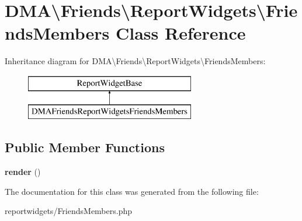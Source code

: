 \hypertarget{classDMA_1_1Friends_1_1ReportWidgets_1_1FriendsMembers}{}\section{D\+M\+A\textbackslash{}Friends\textbackslash{}Report\+Widgets\textbackslash{}Friends\+Members Class Reference}
\label{classDMA_1_1Friends_1_1ReportWidgets_1_1FriendsMembers}
Inheritance diagram for D\+M\+A\textbackslash{}Friends\textbackslash{}Report\+Widgets\textbackslash{}Friends\+Members\+:\begin{figure}[H]
\begin{center}
\leavevmode
\includegraphics[height=2.000000cm]{d4/d9b/classDMA_1_1Friends_1_1ReportWidgets_1_1FriendsMembers}
\end{center}
\end{figure}
\subsection*{Public Member Functions}
\begin{DoxyCompactItemize}
\item 
\hypertarget{classDMA_1_1Friends_1_1ReportWidgets_1_1FriendsMembers_a1ad22ddd3d69c6c350da47bb5e501e88}{}{\bfseries render} ()\label{classDMA_1_1Friends_1_1ReportWidgets_1_1FriendsMembers_a1ad22ddd3d69c6c350da47bb5e501e88}

\end{DoxyCompactItemize}


The documentation for this class was generated from the following file\+:\begin{DoxyCompactItemize}
\item 
reportwidgets/Friends\+Members.\+php\end{DoxyCompactItemize}
